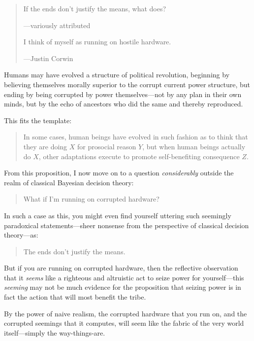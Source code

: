 \begin{quote}
{
 If the ends don't justify the means, what does?}

{\raggedleft
 {}---variously attributed
\par}



{
 I think of myself as running on hostile hardware.}

{\raggedleft
 {}---Justin Corwin
\par}
\end{quote}



{
 Humans may have evolved a structure of political revolution,
beginning by believing themselves morally superior to the corrupt
current power structure, but ending by being corrupted by power
themselves{}---not by any plan in their own minds, but by the echo of
ancestors who did the same and thereby reproduced.}

{
 This fits the template:}

\begin{quote}
{
 In some cases, human beings have evolved in such fashion as to
think that they are doing $X$ for prosocial reason $Y$, but when human
beings actually do $X$, other adaptations execute to promote
self-benefiting consequence $Z$.}
\end{quote}

{
 From this proposition, I now move on to a question
\textit{considerably} outside the realm of classical Bayesian decision
theory:}

\begin{quote}
{
  What if I'm running on corrupted hardware?}
\end{quote}

{
 In such a case as this, you might even find yourself uttering such
seemingly paradoxical statements---sheer nonsense from the perspective
of classical decision theory---as:}

\begin{quote}
{
  The ends don't justify the means.}
\end{quote}

{
 But if you are running on corrupted hardware, then the reflective
observation that it \textit{seems} like a righteous and altruistic act
to seize power for yourself---this \textit{seeming} may not be much
evidence for the proposition that seizing power is in fact the action
that will most benefit the tribe.}

{
 By the power of naive realism, the corrupted hardware that you run
on, and the corrupted seemings that it computes, will seem like the
fabric of the very world itself---simply the way-things-are.}

